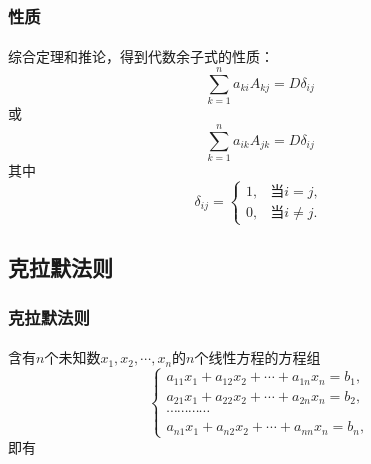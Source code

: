 \subsubsection{性质}
\paragraph{}
综合定理和推论，得到代数余子式的性质：
\begin{equation*}
  \sum_{k=1}^na_{ki}A_{kj} = D\delta_{ij}
\end{equation*}
或
\begin{equation*}
  \sum_{k=1}^na_{ik}A_{jk} = D\delta_{ij}
\end{equation*}
其中
\begin{equation*}
  \delta_{ij} = \left\{\begin{array}{cc}
    1, & \text{当$i=j$}, \\
    0, & \text{当$i\neq j$}.
  \end{array}\right.
\end{equation*}

\subsection{克拉默法则}
\subsubsection{克拉默法则}
\paragraph{}
含有$n$个未知数$x_1,x_2,\cdots,x_n$的$n$个线性方程的方程组
\begin{equation}
  \label{n个线性方程的方程组}
  \left\{\begin{array}{l}
    a_{11}x_1 + a_{12}x_2 + \cdots + a_{1n}x_n = b_1, \\
    a_{21}x_1 + a_{22}x_2 + \cdots + a_{2n}x_n = b_2, \\
    \cdots\cdots\cdots\cdots \\
    a_{n1}x_1 + a_{n2}x_2 + \cdots + a_{nn}x_n = b_n,
  \end{array} \right.
\end{equation}
即有

